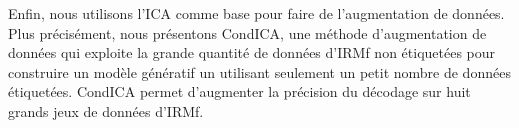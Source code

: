 \begin{otherlanguage}{french}
Enfin, nous utilisons l'ICA comme base pour
faire de l'augmentation de données. Plus précisément, nous présentons CondICA,
une méthode d'augmentation de données qui exploite la grande quantité de données
d'IRMf non étiquetées pour construire un modèle génératif un utilisant seulement
un petit nombre de données étiquetées.
CondICA permet d'augmenter la précision du décodage sur huit grands jeux de données d'IRMf.
\end{otherlanguage}

\endgroup

\vfill
